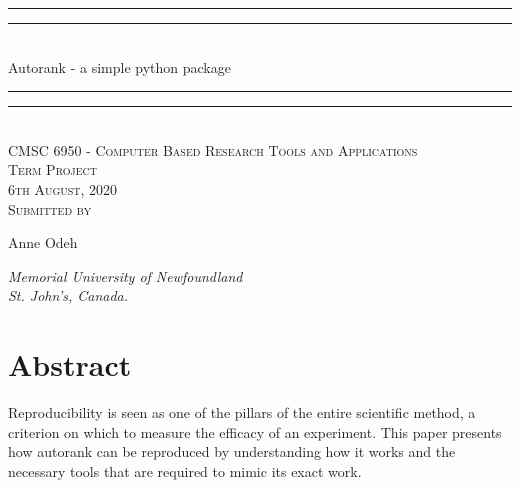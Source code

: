\documentclass[12pt]{article}
\begin{document}
{\centering

\rule{\textwidth}{1.6pt}\vspace*{-\baselineskip}\vspace*{2pt} 
\rule{\textwidth}{0.4pt}\\[\baselineskip] 
{\LARGE Autorank - a simple python package}
\rule{\textwidth}{0.4pt}\vspace*{-\baselineskip}\vspace{3.2pt}
\rule{\textwidth}{1.6pt}\\[\baselineskip] 

\vspace{20mm} %
\scshape %
CMSC 6950 - Computer Based Research Tools and Applications \\ [\baselineskip]
Term Project \\[\baselineskip] 
6th August, 2020 \\[\baselineskip] 
\vspace{20mm} %
Submitted by \\[\baselineskip]
{\Large Anne Odeh \par}
\vfill
{\itshape Memorial University of Newfoundland \\ St. John's, Canada.\par} 
}

\newpage

{\centering
  \section*{Abstract}
}
Reproducibility is seen as one of the pillars of the entire scientific method, a criterion on which to measure the efficacy of an experiment. This paper presents how autorank can be reproduced by understanding how it works and the necessary tools that are required to mimic its exact work. \\\\
\end{document}
